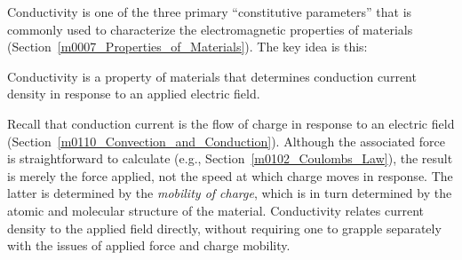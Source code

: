 

\label{m0010_Conductivity} %

Conductivity is one of the three primary ``constitutive parameters'' that is commonly used to characterize the electromagnetic properties of materials (Section~\ref{m0007_Properties_of_Materials}).  The key idea is this:

\begin{mdframed}[backgroundcolor=yellow!20,nobreak=true] 
Conductivity 
is a property of materials that determines conduction current density in response to an applied electric field.
\end{mdframed}
%
Recall that conduction current is the flow of charge in response to an electric field (Section~\ref{m0110_Convection_and_Conduction}).
Although the associated force is straightforward to calculate (e.g., Section~\ref{m0102_Coulombs_Law}), the result is merely the force applied, not the speed at which charge moves in response.  The latter is determined by the \emph{mobility of charge}, 
which is in turn determined by the atomic and molecular structure of the material.  
Conductivity relates current density to the applied field directly, without requiring one to grapple separately with the issues of applied force and charge mobility.


